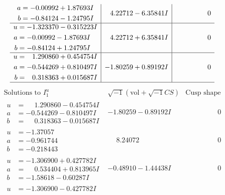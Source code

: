 \documentclass[1p]{elsarticle_modified}
\theoremstyle{definition}
\newcommand{\I}{\sqrt{-1}}
\begin{document}
$$\begin{array}{c|c|c}
\begin{aligned}
a &= -0.00992 + 1.87693 I \\
b &= -0.84124 - 1.24795 I\end{aligned}
 & \phantom{-}4.22712 - 6.35841 I & \phantom{-0.000000 } 0 \\ \hline\begin{aligned}
u &= -1.323370 - 0.315223 I \\
a &= -0.00992 - 1.87693 I \\
b &= -0.84124 + 1.24795 I\end{aligned}
 & \phantom{-}4.22712 + 6.35841 I & \phantom{-0.000000 } 0 \\ \hline\begin{aligned}
u &= \phantom{-}1.290860 + 0.454754 I \\
a &= -0.544269 + 0.810497 I \\
b &= \phantom{-}0.318363 + 0.015687 I\end{aligned}
 & -1.80259 + 0.89192 I & \phantom{-0.000000 } 0\\
 \hline 
 \end{array}$$\newpage$$\begin{array}{c|c|c}  
\text{Solutions to }I^u_{1}& \I (\text{vol} + \sqrt{-1}CS) & \text{Cusp shape}\\
 \hline 
\begin{aligned}
u &= \phantom{-}1.290860 - 0.454754 I \\
a &= -0.544269 - 0.810497 I \\
b &= \phantom{-}0.318363 - 0.015687 I\end{aligned}
 & -1.80259 - 0.89192 I & \phantom{-0.000000 } 0 \\ \hline\begin{aligned}
u &= -1.37057\phantom{ +0.000000I} \\
a &= -0.961744\phantom{ +0.000000I} \\
b &= -0.218443\phantom{ +0.000000I}\end{aligned}
 & \phantom{-}8.24072\phantom{ +0.000000I} & \phantom{-0.000000 } 0 \\ \hline\begin{aligned}
u &= -1.306900 + 0.427782 I \\
a &= \phantom{-}0.534404 + 0.813965 I \\
b &= -1.58618 - 0.60287 I\end{aligned}
 & -0.48910 - 1.44438 I & \phantom{-0.000000 } 0 \\ \hline\begin{aligned}
u &= -1.306900 - 0.427782 I \\

\end{aligned}
\end{array}$$
\end{document}
